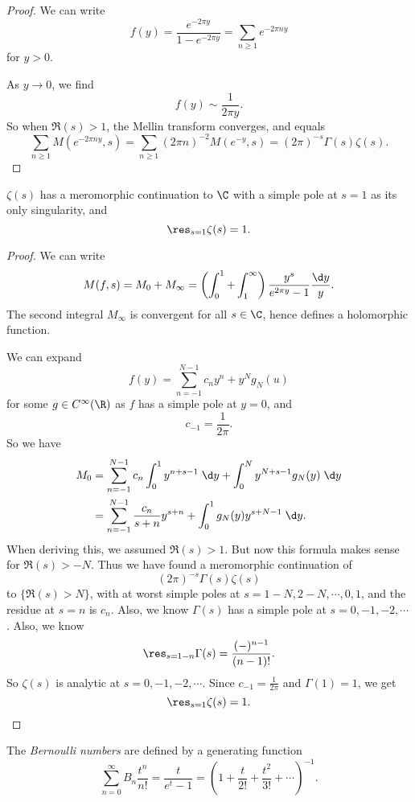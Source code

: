 \documentclass[a4paper]{article}
\begin{document}
\begin{proof}
  We can write
  \[
    f(y) = \frac{e^{-2\pi y}}{1 - e^{-2 \pi y}} = \sum_{n \geq 1} e^{-2\pi n y}
  \]
  for $y > 0$.

  As $y \to 0$, we find
  \[
    f(y) \sim \frac{1}{2\pi y}.
  \]
  So when $\Re(s) > 1$, the Mellin transform converges, and equals
  \[
    \sum_{n \geq 1} M(e^{-2\pi n y}, s) = \sum_{n \geq 1} (2\pi n)^{-2} M(e^{-y}, s) = (2\pi)^{-s} \Gamma(s) \zeta(s).
  \]
\end{proof}

\begin{cor}
  $\zeta(s)$ has a meromorphic continuation to $\C$ with a simple pole at $s = 1$ as its only singularity, and
  \[
    \res_{s = 1}\zeta(s) = 1.
  \]
\end{cor}

\begin{proof}
  We can write
  \[
    M(f, s) = M_0 + M_\infty = \left(\int_0^1 + \int_1^\infty\right) \frac{y^s}{e^{2\pi y} - 1} \frac{\d y}{y}.
  \]
  The second integral $M_\infty$ is convergent for all $s \in \C$, hence defines a holomorphic function.

  We can expand
  \[
    f(y) = \sum_{n = -1}^{N - 1} c_n y^n + y^N g_N(u)
  \]
  for some $g \in C^\infty(\R)$ as $f$ has a simple pole at $y = 0$, and
  \[
    c_{-1} = \frac{1}{2\pi}.
  \]
  So we have
  \begin{align*}
    M_0 &= \sum_{n = -1}^{N - 1} c_n \int_0^1 y^{n + s - 1} \;\d y + \int_0^N y^{N + s - 1} g_N(y) \;\d y\\
    &= \sum_{n = -1}^{N - 1} \frac{c_n}{s + n} y^{s + n} + \int_0^1 g_N(y) y^{s + N - 1} \;\d y.
  \end{align*}
  When deriving this, we assumed $\Re(s) > 1$. But now this formula makes sense for $\Re(s) > -N$. Thus we have found a meromorphic continuation of
  \[
    (2\pi)^{-s} \Gamma(s) \zeta(s)
  \]
  to $\{\Re(s) > N\}$, with at worst simple poles at $s = 1 - N, 2 - N,  \cdots, 0, 1$, and the residue at $s = n$ is $c_n$. Also, we know $\Gamma(s)$ has a simple pole at $s = 0, -1, -2, \cdots$. Also, we know
  \[
    \res_{s = 1 - n} \Gamma(s) = \frac{(-)^{n - 1}}{(n - 1)!}.
  \]
  So $\zeta(s)$ is analytic at $s = 0, -1, -2, \cdots$. Since $c_{-1} = \frac{1}{2\pi}$ and $\Gamma(1) = 1$, we get
  \[
    \res_{s = 1} \zeta(s) = 1.
  \]
\end{proof}

\begin{defi}
  The \emph{Bernoulli numbers} are defined by a generating function
  \[
    \sum_{n = 0}^\infty B_n \frac{t^n}{n!} = \frac{t}{e^t - 1} = \left(1 + \frac{t}{2!} + \frac{t^2}{3!} + \cdots\right)^{-1}.
  \]
\end{defi}
\end{document}
